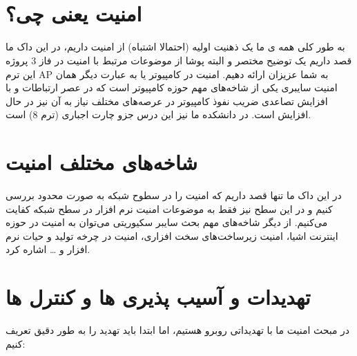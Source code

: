\documentclass[]{article}
\begin{document}
\newpage
\pagestyle{fancy}
\fancyhf{}
\fancyfoot{}
\cfoot{\thepage}
\renewcommand{\headrulewidth}{2pt}

\KashidaOff



\tableofcontents

\newpage

 \Large \textbf{\\\\
}


\section*{{\titr امنیت یعنی چی؟}}

به طور کلی همه ی ما یک ذهنیت اولیه (احتمالا اشتباه) از امنیت داریم، در این داک ما قصد داریم یک توضیح مختصر و البته پوشا از موضوعات مرتبط با امنیت در فاز 3 پروژه این ترم AP به شما عزیزان ارائه دهیم. امنیت در کامپیوتر یا به عبارت دیگر همان امنیت سایبری یکی از شاخه‌های مهم حوزه کامپیوتر است که در عصر ارتباطات و با افزایش تصاعدی ضریب نفوذ کامپیوتر در عرصه‌های مختلف نیاز به آن نیز در حال افزایش است. در دانشکده ما نیز این درس جزو چارت اجباری (ترم 8) است.


\section*{{\titr شاخه‌های مختلف امنیت}}
در این داک ما تنها قصد داریم که امنیت را در سطوح شبکه به صورت محدود بررسی کنیم و در این سطح نیز فقط به موضوعات امنیت نرم افزار در سطح شبکه کفایت می‌کنیم. از دیگر شاخه‌های مهم بحث سایبر سکیوریتی  می‌توان به امنیت در حوزه اینترنت اشیا، امنیت زیرساخت‌های سخت افزاری، امنیت در چرخه تولید و حیات نرم افزار و … اشاره کرد.




\section*{{\titr تهدیدات و آسیب پذیری ها و کنترل ها}}
در مبحث امنیت ما با تهدیداتی روبرو هستیم، اما ابتدا باید تهدید را به طور دقیق تعریف کنیم:
\end{document}

